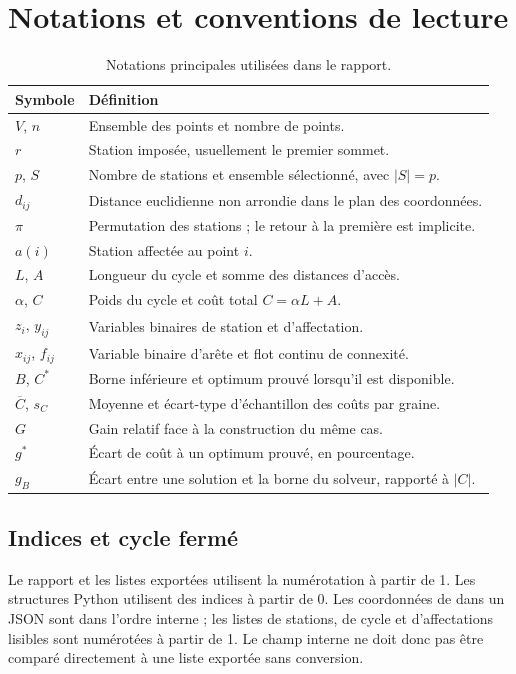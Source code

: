 \chapter{Notations et conventions de lecture}
\begin{table}[htbp]\small
\begin{tabularx}{\textwidth}{lL}\toprule
Symbole & Définition \\\midrule
$V$, $n$ & Ensemble des points et nombre de points. \\
$r$ & Station imposée, usuellement le premier sommet. \\
$p$, $S$ & Nombre de stations et ensemble sélectionné, avec $|S|=p$. \\
$d_{ij}$ & Distance euclidienne non arrondie dans le plan des coordonnées. \\
$\pi$ & Permutation des stations ; le retour à la première est implicite. \\
$a(i)$ & Station affectée au point $i$. \\
$L$, $A$ & Longueur du cycle et somme des distances d'accès. \\
$\alpha$, $C$ & Poids du cycle et coût total $C=\alpha L+A$. \\
$z_i$, $y_{ij}$ & Variables binaires de station et d'affectation. \\
$x_{ij}$, $f_{ij}$ & Variable binaire d'arête et flot continu de connexité. \\
$B$, $C^*$ & Borne inférieure et optimum prouvé lorsqu'il est disponible. \\
$\overline C$, $s_C$ & Moyenne et écart-type d'échantillon des coûts par graine. \\
$G$ & Gain relatif face à la construction du même cas. \\
$g^*$ & Écart de coût à un optimum prouvé, en pourcentage. \\
$g_B$ & Écart entre une solution et la borne du solveur, rapporté à $|C|$. \\
\bottomrule\end{tabularx}
\caption{Notations principales utilisées dans le rapport.}
\end{table}

\section{Indices et cycle fermé}
Le rapport et les listes exportées utilisent la numérotation à partir de 1.
Les structures Python utilisent des indices à partir de 0. Les coordonnées
de  dans un JSON sont dans l'ordre interne ; les listes de
stations, de cycle et d'affectations lisibles sont numérotées à partir de 1.
Le champ interne  ne doit donc pas être
comparé directement à une liste exportée sans conversion.

